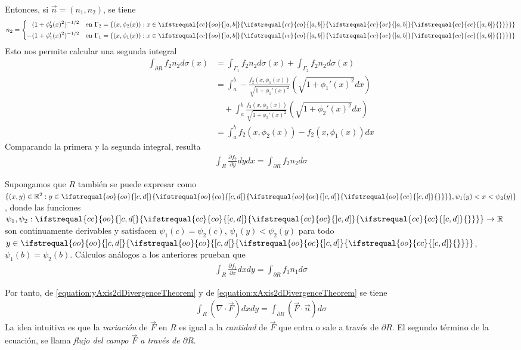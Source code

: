 \documentclass{report}
\newcommand{\realNumbers}{\mathbb{R}}
\theoremstyle{remark}
\newcommand{\leftOpenInterval}{\left]}
\newcommand{\rightOpenInterval}{\right[}
\newcommand{\leftClosedInterval}{\left[}
\newcommand{\rightClosedInterval}{\right]}
\newcommand{\interval}[3]{%
  \ifstrequal{#1}{oo}{%
    \leftOpenInterval #2, #3 \rightOpenInterval%
  }{%
    \ifstrequal{#1}{co}{%
      \leftClosedInterval #2, #3 \rightOpenInterval%
    }{%
      \ifstrequal{#1}{oc}{
        \leftOpenInterval #2, #3 \rightClosedInterval%
      }{%
        \ifstrequal{#1}{cc}{
          \leftClosedInterval #2, #3 \rightClosedInterval
        }{%
        }%
      }%
    }%
  }%
}
\begin{document}
  Entonces, si \(\vec{n} = (n_1, n_2)\), se tiene 
  \begin{align}
    n_2
    =
    \left\{
      \begin{aligned}
        (1 + \phi_2'(x)^2)^{- 1 / 2}
        && \text{en }
        \Gamma_2 = \{(x, \phi_2(x)) : x \in \interval{cc}{a}{b}\}
        \\
        - (1 + \phi_1'(x)^2)^{- 1 / 2}
        && \text{en }
        \Gamma_1 = \{(x, \phi_1(x)) : x \in \interval{cc}{a}{b}\}
      \end{aligned}
    \right.
  \end{align}
  Esto nos permite calcular una segunda integral
  \begin{align}
    \int_{\partial R} f_2 n_2 d \sigma(x)
    &=
    \int_{\Gamma_1} f_2 n_2 d \sigma(x)
    + \int_{\Gamma_2} f_2 n_2 d \sigma(x)
    \\
    &=
    \int_a^b
      - \frac{f_2(x, \phi_1(x))}{\sqrt{1 + \phi_1'(x)^2}}
    \left( \sqrt{1 + \phi_1'(x)^2} d x \right)
    \\
    &\quad
      + \int_a^b
        \frac{f_2(x, \phi_2(x))}{\sqrt{1 + \phi_2'(x)^2}}
      \left( \sqrt{1 + \phi_2'(x)^2} d x \right)
    \\
    &=
    \int_a^b f_2(x, \phi_2(x)) - f_2(x, \phi_1(x)) dx
  \end{align}
  Comparando la primera y la segunda integral, resulta
  \begin{align}
    \label{equation:yAxis2dDivergenceTheorem}
    \int_R \frac{\partial f_2}{\partial y} dy dx
    =
    \int_{\partial R} f_2 n_2 d \sigma
  \end{align}

  Supongamos que \(R\) también se puede expresar como \(\{(x, y) \in \realNumbers^2 : y \in \interval{oo}{c}{d}, \psi_1(y) < x < \psi_2(y)\}\), donde las funciones \(\psi_1, \psi_2 : \interval{cc}{c}{d} \rightarrow \realNumbers\) son continuamente derivables y satisfacen \(\psi_1(c) = \psi_2(c)\), \(\psi_1(y) < \psi_2(y)\) para todo \(y \in \interval{oo}{c}{d}\), \(\psi_1(b) = \psi_2(b)\).
  Cálculos análogos a los anteriores prueban que
  \begin{align}
    \label{equation:xAxis2dDivergenceTheorem}
    \int_R \frac{\partial f_1}{\partial x} dx dy
    =
    \int_{\partial R} f_1 n_1 d \sigma
  \end{align}

  Por tanto, de \eqref{equation:yAxis2dDivergenceTheorem} y de \eqref{equation:xAxis2dDivergenceTheorem} se tiene
  \begin{align}
    \label{equation:GaussDivergenceTheorem}
    \int_R (\nabla \cdot \vec{F}) dx dy
    =
    \int_{\partial R} (\vec{F} \cdot \vec{n}) d \sigma
  \end{align}
  La idea intuitiva es que la \emph{variación} de \(\vec{F}\) en \(R\) es igual a la \emph{cantidad} de \(\vec{F}\) que entra o sale a través de \(\partial R\).
  El segundo término de la ecuación, se llama \emph{flujo del campo \(\vec{F}\) a través de \(\partial R\)}.
\end{document}
